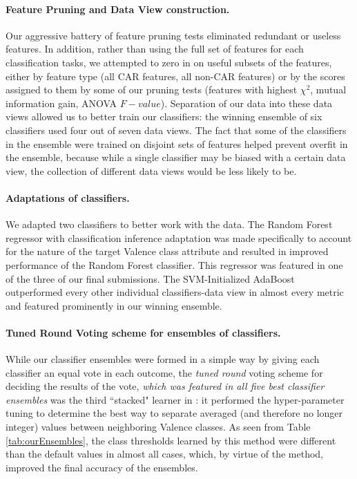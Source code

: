 \paragraph{Feature Pruning and Data View construction.} Our aggressive
battery of feature pruning tests eliminated redundant or useless features.
In addition, rather than using the full set of features for each classification
tasks, we attempted to zero in on useful subsets of the features, either by
feature type (all CAR features, all non-CAR features) or by the scores
assigned to them by some of our pruning tests (features with highest
$\chi^2$, mutual information gain, ANOVA $F-value$). Separation of our
data into these data views allowed us to better train our classifiers:
the winning ensemble of six classifiers used four out of seven data views.
The fact that some of the classifiers in the ensemble were trained
on disjoint sets of features helped prevent overfit in the ensemble, because while
a single classifier may be biased with a certain data view, the collection
of different data views would be less likely to be. 

\paragraph{Adaptations of classifiers.} We adapted two classifiers
to better work with the data. The \textsf{Random Forest regressor with classification
inference} adaptation was made specifically to account for the nature
of the target \textsf{Valence} class attribute and resulted in improved
performance of the Random Forest classifier. This regressor was featured
in one of the three of our final submissions.  The 
\textsf{SVM-Initialized AdaBoost} outperformed every other individual
classifiers-data view in almost every metric and featured prominently in our winning ensemble.

\paragraph{Tuned Round Voting scheme for ensembles of classifiers.} While
our classifier ensembles were formed in a simple way by giving each classifier
an equal vote in each outcome, the \textit{tuned round} voting scheme for
deciding the results of the vote, \textit{which was featured in all five
best classifier ensembles} was the third ``stacked" learner in \CREATE:
it performed the hyper-parameter tuning to determine the best
way to separate averaged (and therefore no longer integer) values
between neighboring \textsf{Valence} classes. As seen
from Table \ref{tab:ourEnsembles}, the class thresholds learned 
by this method were different than the default values in almost all
cases, which, by virtue of the method, improved the final accuracy of
the ensembles.

